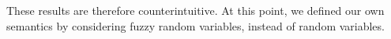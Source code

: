 \documentclass[a4paper,10pt]{llncs}
\newcommand\todo[1]{{\color{red}\textbf{[TO DO:  #1]}}}
\begin{document}
These results are therefore counterintuitive. At this point, we defined our own semantics by considering fuzzy random variables, instead of random variables.
	
%
%
%
\end{document}
